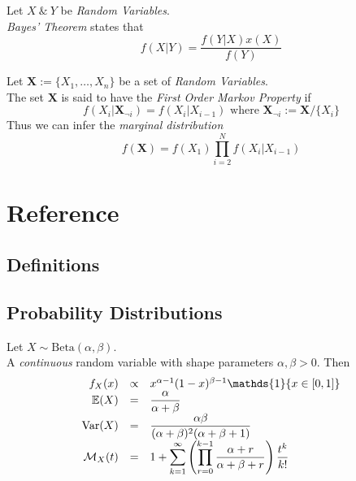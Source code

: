 \documentclass[11pt,a4paper]{article}
\begin{document}
Let $X\ \&\ Y$ be \textit{Random Variables}.\\
\textit{Bayes' Theorem} states that
$$f(X|Y)=\dfrac{f(Y|X)x(X)}{f(Y)}$$

Let $\textbf{X}:=\{X_1,\dots,X_n\}$ be a set of \textit{Random Variables}.\\
The set $\textbf{X}$ is said to have the \textit{First Order Markov Property} if
$$f(X_i|\textbf{X}_{\neg i})= f(X_i|X_{i-1})\text{ where }\textbf{X}_{\neg i}:=\textbf{X}/\{X_i\}$$
Thus we can infer the \textit{marginal distribution}
$$f(\textbf{X})=f(X_1)\prod_{i=2}^Nf(X_i|X_{i-1})$$


\setcounter{section}{-1}
\section{Reference}

\subsection{Definitions}



\subsection{Probability Distributions}

Let $X\sim\text{Beta}(\alpha,\beta)$.\\
A \textit{continuous} random variable with shape parameters $\alpha,\beta>0$. Then
\[\begin{array}{rcl}
f_X(x)&\propto&x^{\alpha-1}(1-x)^{\beta-1}\mathds{1}\{x\in[0,1]\}\\
\expect(X)&=&\dfrac{\alpha}{\alpha+\beta}\\
\var(X)&=&\dfrac{\alpha\beta}{(\alpha+\beta)^2(\alpha+\beta+1)}\\
\mathcal{M}_X(t)&=&1+{\displaystyle\sum_{k=1}^\infty\left(\prod_{r=0}^{k-1}\dfrac{\alpha+r}{\alpha+\beta+r}\right)\dfrac{t^k}{k!}}
\end{array}\]
\end{document}
